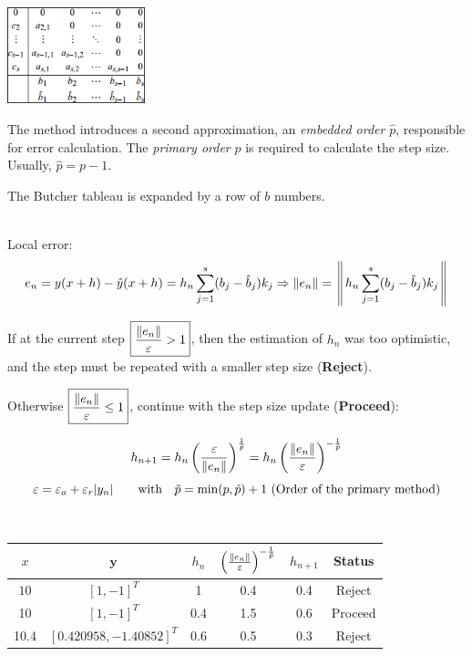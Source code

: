     \\
    \begin{minipage}{5cm}
        \includegraphics[width=4cm]{./bilder/ode_adaptive_butcher.png}
    \end{minipage}
    \begin{minipage}{13cm}
        The method introduces a second approximation, an \emph{embedded order} $\hat{p}$, responsible for error calculation. The \emph{primary order} $p$ is required to calculate the step size. Usually, $\hat{p} = p-1$.

        The Butcher tableau is expanded by a row of $b$ numbers.
    \end{minipage}\\

    Local error:
    $$e_n = y(x+h) - \hat{y}(x+h) = h_n \sum\limits_{j=1}^s (b_j - \hat{b}_j)k_j \Rightarrow
    \Arrowvert e_n \Arrowvert = \left\Arrowvert h_n \sum\limits_{j=1}^s (b_j - \hat{b}_j)k_j \right\Arrowvert$$

    \begin{minipage}{7.5cm}
        If at the current step $\boxed{\frac{\Arrowvert e_n \Arrowvert}{\varepsilon} > 1}$, then the estimation of $h_n$ was too optimistic, and the step must be repeated with a smaller step size (\textbf{Reject}).

        Otherwise $\boxed{\frac{\Arrowvert e_n \Arrowvert}{\varepsilon} \leq 1}$, continue with the step size update (\textbf{Proceed}):

        $$h_{n+1} = h_n \left( \frac{\varepsilon}{\Arrowvert e_n \Arrowvert} \right)^{\frac{1}{\tilde{p}}}=
        h_n \left( \frac{\Arrowvert e_n \Arrowvert}{\varepsilon} \right)^{-\frac{1}{\tilde{p}}}$$
        $$\varepsilon=\varepsilon_a+\varepsilon_r|y_n|
        \text{\qquad with\quad} \tilde{p} = \min(p, \hat{p})+1 \text{ (Order of the primary method)}$$
    \end{minipage}
    \hspace{0.5cm}
    \begin{minipage}{10.5cm}
        \\
        \begin{tabular}{cccccc}
            \hline
            $x$ & $\bm y$ & $h_n$ & $\left( \frac{\Arrowvert e_n \Arrowvert}{\varepsilon} \right)^{-\frac{1}{\tilde{p}}}$ & $h_{n+1}$ & Status \\
            \hline
            $10$ & $[1, -1]^T$ & 1 & 0.4 & 0.4 & Reject\\
            10 & $[1,-1]^T$ & 0.4 & 1.5 & 0.6 & Proceed\\
            10.4 & $[0.420958, -1.40852]^T$ & 0.6 & 0.5 & 0.3 & Reject\\
            \hline
        \end{tabular}
    \end{minipage}

